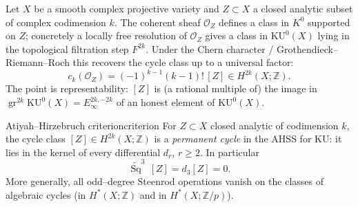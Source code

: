 \documentclass{article}
\newcommand{\Z}{{\mathbb{Z}}}
\DeclareMathOperator{\Sq}{Sq}
\newcommand{\KU}{\mathrm{KU}}
\renewcommand{\O}{\mathcal{O}}
\newcommand{\gr}{\operatorname{gr}}
\begin{document}
Let $X$ be a smooth complex projective variety and $Z\subset X$ a closed analytic
subset of complex codimension $k$. The coherent sheaf $\O_Z$ defines a class in
$K^0$ supported on $Z$; concretely a locally free resolution of $\O_Z$ gives a
class in $\KU^0(X)$ lying in the topological filtration step $F^{2k}$. Under the
Chern character / Grothendieck--Riemann--Roch this recovers the cycle class up to
a universal factor:
\begin{equation}\label{eq:GRR}
  c_k(\O_Z)=(-1)^{k-1}(k-1)!\,[Z]\in H^{2k}(X;\Z).
\end{equation}
The point is representability: $[Z]$ is (a rational multiple of) the image in
$\gr^{2k}\KU^0(X)=E_\infty^{2k,-2k}$ of an honest element of $\KU^0(X)$.

\begin{thm}{Atiyah--Hirzebruch criterion}{criterion}
For $Z\subset X$ closed analytic of codimension $k$, the cycle class
$[Z]\in H^{2k}(X;\Z)$ is a \emph{permanent cycle} in the AHSS for $\KU$: it lies
in the kernel of every differential $d_r$, $r\ge 2$. In particular
\[
  \widetilde{\Sq}^3\,[Z]=d_3[Z]=0 .
\]
More generally, all odd--degree Steenrod operations vanish on the classes of
algebraic cycles (in $H^*(X;\Z)$ and in $H^*(X;\Z/p)$).
\end{thm}
\end{document}
